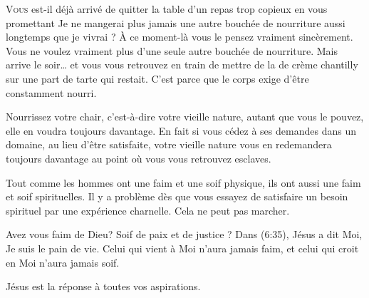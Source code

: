 


\lettrine{V}{ous} est-il déjà arrivé de quitter la table d'un repas
 trop copieux en vous promettant\frcolon{}
 \Og Je ne mangerai plus jamais une autre bouchée de nourriture aussi longtemps
 que je vivrai \Fg{} ?
 \`A ce moment-là vous le pensez vraiment sincèrement.
 Vous ne voulez vraiment plus d'une seule autre bouchée de nourriture.
 Mais arrive le soir\dots{} et vous vous retrouvez en train de mettre
 de la de crème chantilly sur une part de tarte qui restait.
 C'est parce que le corps exige d'être constamment nourri.


Nourrissez votre chair, c'est-à-dire votre vieille nature,
 autant que vous le pouvez, elle en voudra toujours davantage.
 En fait si vous cédez à ses demandes dans un domaine,
 au lieu d'être satisfaite, votre vieille nature vous en redemandera
 toujours davantage au point où vous vous retrouvez esclaves.

Tout comme les hommes ont une faim et une soif physique,
 ils ont aussi une faim et soif spirituelles.
 Il y a problème dès que vous essayez de satisfaire un besoin spirituel
 par une expérience charnelle. Cela ne peut pas marcher.

Avez vous faim de Dieu? Soif de paix et de justice ?
 Dans (6:35), Jésus a dit\frcolon{}
 \Og Moi, Je suis le pain de vie. Celui qui vient à Moi n'aura jamais faim,
 et celui qui croit en Moi n'aura jamais soif. \Fg{}

Jésus est la réponse à toutes vos aspirations. 

\dvrule




